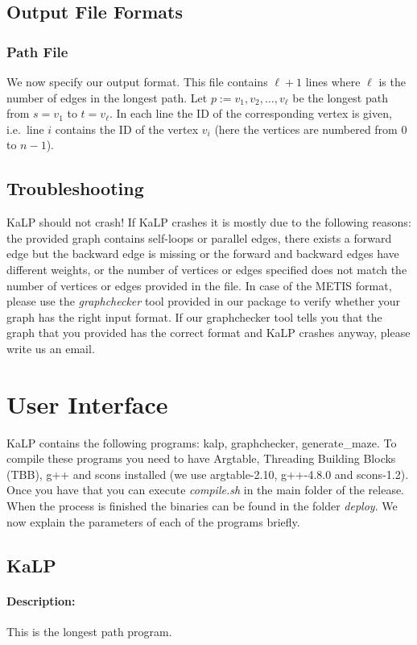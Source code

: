\documentclass[11pt]{article}
\newcommand{\ie}{i.e.\ }
\begin{document}
\subsection{Output File Formats}
\subsubsection{Path File}
We now specify our output format. 
This file contains $\ell+1$ lines where $\ell$ is the number of edges in the longest path.
Let $p := v_1, v_2, \ldots, v_{\ell}$ be the longest path from $s=v_1$ to $t=v_\ell$.
In each line the ID of the corresponding vertex is given, \ie line $i$ contains the ID of the vertex $v_i$ (here the vertices are numbered from 0 to $n-1$).
\subsection{Troubleshooting}
KaLP should not crash! If KaLP crashes it is mostly due to the following reasons: the provided graph contains self-loops or parallel edges, there exists a forward edge but the backward edge is missing or the forward and backward edges have different weights, or the number of vertices or edges specified does not match the number of vertices or edges provided in the file.
In case of the METIS format, please use the \emph{graphchecker} tool provided in our package to verify whether your graph has the right input format. If our graphchecker tool tells you that the graph that you provided has the correct format and KaLP crashes anyway, please write us an email.

\vfill
\pagebreak
\section{User Interface}
KaLP contains the following programs: kalp, graphchecker, generate\_maze. To compile these programs you need to have Argtable, Threading Building Blocks (TBB), g++ and scons installed (we use argtable-2.10, g++-4.8.0 and scons-1.2). Once you have that you can execute \emph{compile.sh} in the main folder of the release. When the process is finished the binaries can be found in the folder \emph{deploy}. We now explain the parameters of each of the programs briefly.
\subsection{KaLP}
\paragraph*{Description:} This is the longest path program. 
\end{document}
